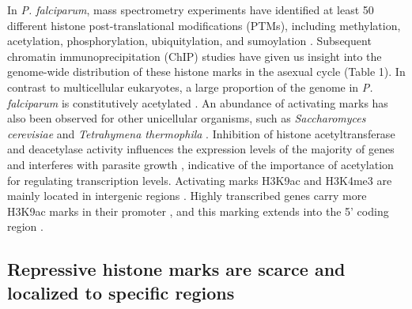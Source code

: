 In \textit{P. falciparum}, mass spectrometry experiments have identified at
least 50 different histone post-translational modifications (PTMs), including
methylation, acetylation, phosphorylation, ubiquitylation, and sumoylation
\citep{lasonder:insights, miao:malaria, treeck:phosphoproteomes,
trelle:global}. Subsequent chromatin immunoprecipitation (ChIP) studies have
given us insight into the genome-wide distribution of these histone marks in
the asexual cycle (Table 1). In contrast to multicellular eukaryotes, a large
proportion of the genome in \textit{P. falciparum} is constitutively
acetylated \citep{miao:malaria, lopez-rubio:genome-wide}. An abundance of
activating marks has also been observed for other unicellular organisms, such
as \textit{Saccharomyces cerevisiae} and \textit{Tetrahymena thermophila}
\citep{garcia:organismal}. Inhibition of
histone acetyltransferase and deacetylase activity influences the expression
levels of the majority of genes and interferes with parasite growth
\citep{cui:histone, cui:cytotoxic, chaal:histone},
indicative of the importance of acetylation for regulating transcription
levels. Activating marks H3K9ac and H3K4me3 are mainly located in intergenic
regions \citep{bartfai:h2az, jiang:pfsetvs, salcedo-amaya:dynamic}.
Highly transcribed genes carry more H3K9ac marks in their
promoter \citep{bartfai:h2az}, 
and this marking extends into the 5’ coding region
\citep{salcedo-amaya:dynamic}.

\subsection{Repressive histone marks are scarce and localized to specific
regions}

